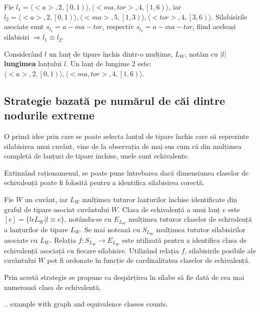 \begin{ex}
Fie $l_1 = \langle <a>, 2, \left[ 0, 1 \right)\rangle, \langle <ma, tor>, 4, \left[ 1, 6 \right)\rangle$, iar $l_2 = \langle <a>, 2, \left[ 0, 1 \right)\rangle, \langle <ma>, 5, \left[ 1, 3 \right)\rangle, \langle <tor>, 4, \left[ 3, 6 \right)\rangle$. Silabisirile asociate sunt $s_{l_1} = a-ma-tor$, respectiv $s_{l_2} = a-ma-tor$, fiind aceleași silabisiri $\Rightarrow l_1 \equiv l_2$.
\end{ex}

\begin{defi}
Considerând $l$ un lanț de tipare închis dintr-o mulțime, $L_W$, notăm cu $\vert l \vert $ \textbf{lungimea} lanțului $l$. Un lanț de lungime 2 este: $\langle <a>, 2, \left[ 0, 1 \right)\rangle, \langle <ma, tor>, 4, \left[ 1, 6 \right)\rangle$.
\end{defi}


\subsection{Strategie bazată pe numărul de căi dintre nodurile extreme}

O primă idee prin care se poate selecta lanțul de tipare închis care să reprezinte silabisirea unui cuvânt, vine de la observația de mai sus cum că din mulțimea completă de lanțuri de tipare inchise, unele sunt echivalente. 

Extinzând raționamenul, se poate pune întrebarea dacă dimensiunea claselor de echivalență poate fi folosită pentru a identifica silabisirea corectă. 

Fie $W$ un cuvânt, iar $L_W$ mulțimea tuturor lanțurilor închise identificate din graful de tipare asociat cuvântului $W$. Clasa de echivalență a unui lanț $e$ este $\left[e\right] = \{l \epsilon L_W \vert l \equiv e\}$, notându-se cu $E_{L_W}$ mulțimea tuturor claselor de echivalență a lanțurilor de tipare $L_W$. Se mai notează cu $S_{L_W}$ mulțimea tututor silabisirilor asociate cu $L_W$. Relația $f: S_{L_W} \rightarrow E_{L_W}$ este utilizată pentru a identifica clasa de echivalență asociață cu fiecare silabisire. Utilizând relația $f$, silabisirile posibile ale cuvântului $W$ pot fi ordonate în funcție de cardinalitatea claselor de echivalență. 

Prin acestă strategie se propune ca despărțirea în silabe să fie dată de cea mai numeroasă clasa de echivalentă.

\begin{ex}
.. example with graph and equivalence classes counts.
\end{ex}

